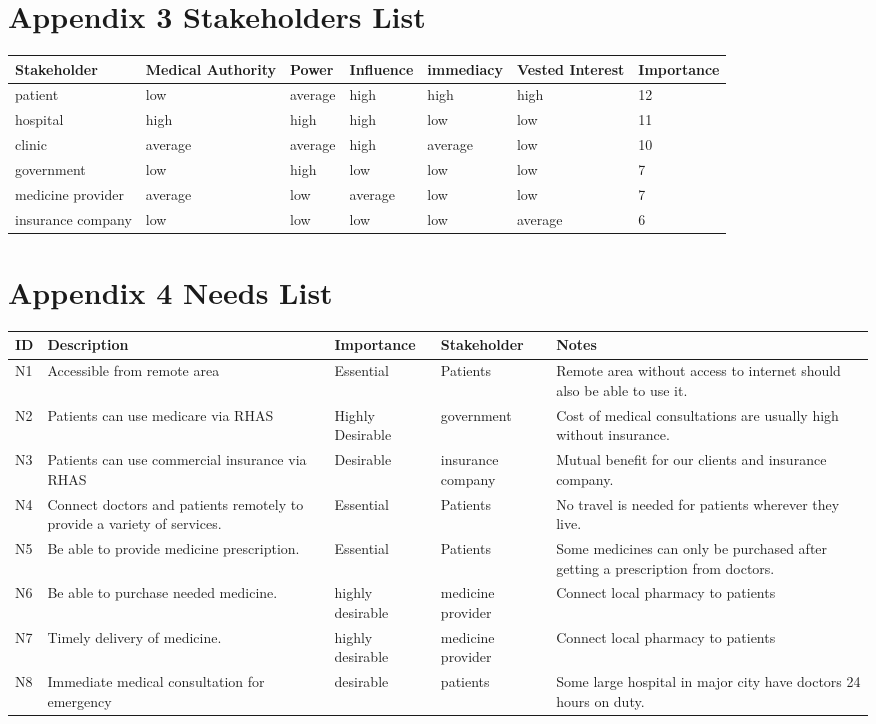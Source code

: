 \documentclass{article}
\begin{document}
\section{Appendix 3 Stakeholders List}
\begin{center}
\begin{tabular}{ | m{5em} | m{5em}| m{4em} | m{4em} | m{5em} | m{4em} | m{5em} | } 
  \hline
  Stakeholder & Medical Authority & Power & Influence & immediacy & Vested Interest & Importance\\ 
  \hline
  patient & low & average & high & high & high & 12\\
  \hline
  hospital & high & high & high & low & low & 11\\
  \hline
  clinic & average & average & high & average & low & 10\\
  \hline
  government & low & high & low & low & low & 7\\
  \hline
  medicine provider & average & low & average & low & low & 7\\
  \hline
  insurance company & low & low & low & low & average & 6\\
  \hline
\end{tabular}
\end{center}
\section{Appendix 4 Needs List}
\begin{center}
\begin{tabular}{ | m{2em} | m{9em}| m{5em} | m{5em} | m{12em} |} 
  \hline
  ID & Description & Importance & Stakeholder & Notes\\ 
  \hline
  N1 & Accessible from remote area & Essential & Patients & Remote area without access to internet should also be able to use it.\\
  \hline
  N2 & Patients can use medicare via RHAS & Highly  Desirable & government & Cost of medical consultations are usually high without insurance.\\
  \hline
  N3 & Patients can use commercial insurance via RHAS & Desirable & insurance company & Mutual benefit for our clients and insurance company.\\
  \hline
  N4 & Connect doctors and patients remotely to provide a variety of services. & Essential & Patients & No travel is needed for patients wherever they live.\\
  \hline
  N5 & Be able to provide medicine prescription. & Essential & Patients & Some medicines can only be purchased after getting a prescription from doctors.\\
  \hline
  N6 & Be able to purchase needed medicine. & highly desirable & medicine provider & Connect local pharmacy to patients\\
  \hline
  N7 & Timely delivery of medicine. & highly desirable & medicine provider & Connect local pharmacy to patients\\
  \hline
  N8 & Immediate medical consultation for emergency & desirable & patients & Some large hospital in major city have doctors 24 hours on duty.\\
  \hline
\end{tabular}
\end{center}
\end{document}
